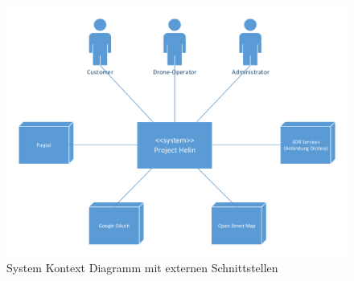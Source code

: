 \begin{figure}[h]
\includegraphics[width=1.0\textwidth]{images/system-context-diagram.pdf}
\caption{System Kontext Diagramm mit externen Schnittstellen }
\label{fig:system-context-diagram}
\end{figure}









